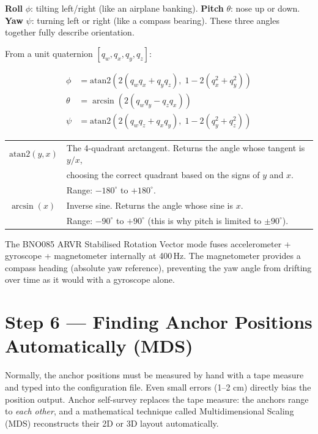\documentclass[11pt,a4paper]{article}
\begin{document}
\begin{analogy}
\textbf{Roll} $\phi$: tilting left/right (like an airplane banking). \textbf{Pitch} $\theta$: nose up or down. \textbf{Yaw} $\psi$: turning left or right (like a compass bearing). These three angles together fully describe orientation.
\end{analogy}

From a unit quaternion $[q_w, q_x, q_y, q_z]$:

\begin{align}
\phi   &= \text{atan2}\!\left(2(q_wq_x + q_yq_z),\; 1 - 2(q_x^2+q_y^2)\right) \label{eq:roll}\\
\theta &= \arcsin\!\left(2(q_wq_y - q_zq_x)\right) \label{eq:pitch}\\
\psi   &= \text{atan2}\!\left(2(q_wq_z + q_xq_y),\; 1 - 2(q_y^2+q_z^2)\right) \label{eq:yaw}
\end{align}

\begin{symbols}
\begin{tabular}{ll}
$\text{atan2}(y, x)$ & The 4-quadrant arctangent. Returns the angle whose tangent is $y/x$, \\
   & choosing the correct quadrant based on the signs of $y$ and $x$. \\
   & Range: $-180^\circ$ to $+180^\circ$. \\
$\arcsin(x)$ & Inverse sine. Returns the angle whose sine is $x$. \\
   & Range: $-90^\circ$ to $+90^\circ$ (this is why pitch is limited to $\pm90^\circ$). \\
\end{tabular}
\end{symbols}

The BNO085 ARVR Stabilised Rotation Vector mode fuses accelerometer + gyroscope + magnetometer internally at 400\,Hz. The magnetometer provides a compass heading (absolute yaw reference), preventing the yaw angle from drifting over time as it would with a gyroscope alone.

\section{Step 6 --- Finding Anchor Positions Automatically (MDS)}
\label{sec:mds}

\begin{plain}
Normally, the anchor positions must be measured by hand with a tape measure and typed into the configuration file. Even small errors (1--2 cm) directly bias the position output. Anchor self-survey replaces the tape measure: the anchors range to \emph{each other}, and a mathematical technique called Multidimensional Scaling (MDS) reconstructs their 2D or 3D layout automatically.
\end{plain}
\end{document}
